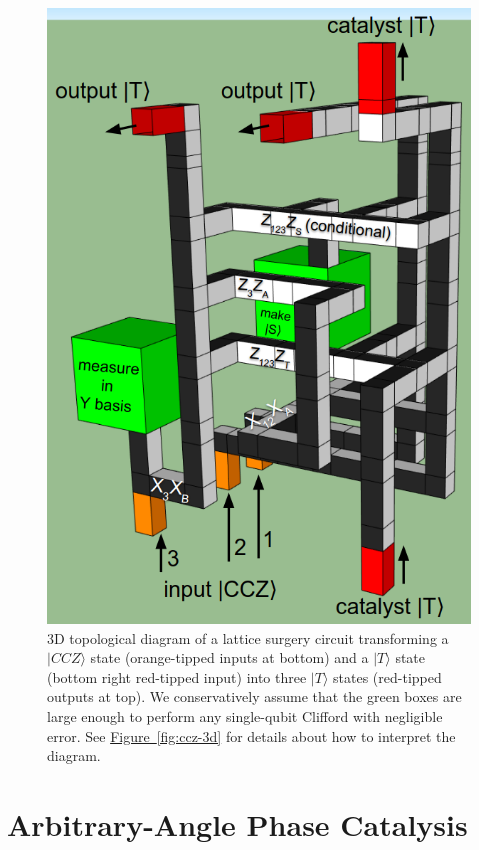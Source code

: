 \documentclass[superscriptaddress,notitlepage,longbibliography]{revtex4-1}
\newcommand{\fig}[1]{\hyperref[fig:#1]{Figure~\ref*{fig:#1}}}
\begin{document}
\begin{figure}[ht]
  \label{fig:catalysis-3d}
  \includegraphics[width=\textwidth,height=\dimexpr\textheight-6\baselineskip,keepaspectratio]{catalysis-3d.png}
  \caption{
    3D topological diagram of a lattice surgery circuit transforming a $|CCZ\rangle$ state (orange-tipped inputs at bottom) and a $|T\rangle$ state (bottom right red-tipped input) into three $|T\rangle$ states (red-tipped outputs at top).
    We conservatively assume that the green boxes are large enough to perform any single-qubit Clifford with negligible error.
    See \fig{ccz-3d} for details about how to interpret the diagram.
  }
\end{figure}



\section{Arbitrary-Angle Phase Catalysis}
\label{sec:generalize}
\end{document}
